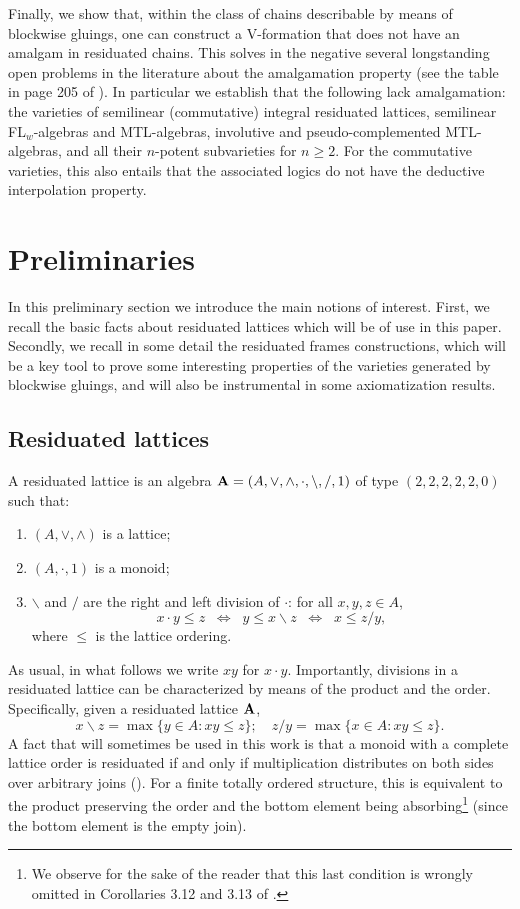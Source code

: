 \documentclass{amsart}
\theoremstyle{definition}
\numberwithin{equation}{section}
\newcommand{\alg}[1]{{\textbf{\upshape #1}}}  %
\newcommand{\back}{\backslash}
\begin{document}
Finally, we show that, within the class of chains describable by means of blockwise gluings, one can construct a V-formation that does not have an amalgam in residuated chains. This solves in the negative several longstanding open problems in the literature about the amalgamation property (see the table in page 205 of \cite{MPT2023}). In particular we establish that the following lack amalgamation: the varieties of semilinear (commutative) integral residuated lattices, semilinear FL$_w$-algebras and MTL-algebras, involutive and pseudo-complemented MTL-algebras, and all their $n$-potent subvarieties for $n\geq 2$. For the commutative varieties, this also entails that the associated logics do not have the deductive interpolation property.  


\section{Preliminaries}
In this preliminary section we introduce the main notions of interest. First, we recall the basic facts about residuated lattices which will be of use in this paper. Secondly, we recall in some detail the residuated frames constructions, which will be a key tool to prove some interesting properties of the varieties generated by blockwise gluings, and will also be instrumental in some axiomatization results.

\subsection{Residuated lattices}A residuated lattice is an algebra $\alg A = ( A,\lor,\land,\cdot,\back, /, 1)$ of type $(2, 2, 2, 2, 2, 0)$ such that:
\begin{enumerate}
\item $(A, \lor, \land )$ is a lattice;
\item $(A, \cdot, 1)$ is a monoid;
\item $\back$ and $/$ are the right and left division of $\cdot$: for all $x,y, z \in A$,
$$
x \cdot y \leq z \;\;\Leftrightarrow\;\; y \leq x \back z \;\;\Leftrightarrow\;\; x \leq z /y,
$$
where $\leq$ is  the lattice ordering.
\end{enumerate}
As usual, in what follows we write $xy$ for $x \cdot y$. 
Importantly, divisions in a residuated lattice can be characterized by means of the product and the order. Specifically, given a residuated lattice $\alg A$,
\begin{equation}
	x \backslash z = \max \{y \in A: xy \leq z\}; \quad z / y = \max\{x \in A: xy \leq z\}.
\end{equation}
A fact that will sometimes be used in this work is that a monoid with a complete lattice order is residuated if and only if multiplication distributes on both sides over arbitrary joins (\cite[Corollary 3.11]{GJKO}). For a finite totally ordered structure, this is equivalent to the product preserving the order and the bottom element being absorbing\footnote{We observe for the sake of the reader that this last condition is wrongly omitted in Corollaries 3.12 and 3.13 of \cite{GJKO}.} (since the bottom element is the empty join).
\end{document}
